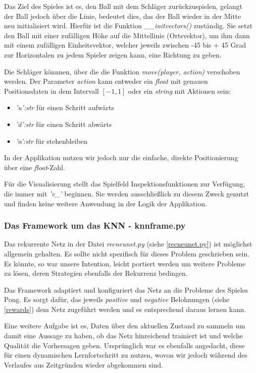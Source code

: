 \documentclass[12pt,twoside]{article}
\theoremstyle{plain}
\theoremstyle{definition}
\theoremstyle{remark}
\begin{document}
Das Ziel des Spieles ist es, den Ball mit dem Schläger zurückzuspielen, gelangt der Ball jedoch über die Linie, bedeutet dies, das der Ball wieder in der Mitte neu initialisiert wird. Hierfür ist die Funktion \textit{\_\_initvectors()} zuständig. Sie setzt den Ball mit einer zufälligen Höhe auf die Mittellinie (Ortsvektor), um ihm dann mit einem zufälligen Einheitsvektor, welcher jeweils zwischen -45 bis + 45 Grad zur Horizontalen zu jedem Spieler zeigen kann, eine Richtung zu geben.

Die Schläger könnnen, über die die Funktion \textit{move(player, action)} verschoben werden. Der Parameter \textit{action} kann entweder ein \textit{float} mit genauen Positionsdaten in dem Intervall
$ [-1 , 1] $ oder ein \textit{string} mit Aktionen sein:
\begin{itemize}
  \item \textit{'u':str} für einen Schritt aufwärts 
  \item \textit{'d':str} für einen Schritt abwärts 
  \item \textit{'n':str} für stehenbleiben
\end{itemize}
In der Applikation nutzen wir jedoch nur die einfache, direkte Positionierung über eine \textit{float}-Zahl.

Für die Visualisierung stellt das Spielfeld Inspektionsfunktionen zur Verfügung, die immer mit \textit{'v\_'} beginnen. Sie werden ausschließlich zu diesem Zweck genutzt und finden keine weitere Anwendung in der Logik der Applikation.

\subsubsection{Das Framework um das KNN - knnframe.py}
\label{knnframe.py}

Das rekurrente Netz in der Datei \textit{recneunet.py} (siehe \ref{recneunet.py}) ist möglichst allgemein gehalten. Es sollte nicht spezifisch für dieses Problem geschrieben sein. Es könnte, so war unsere Intention, leicht portiert werden um weitere Probleme zu lösen, deren Strategien ebenfalls der Rekurrenz bedingen.

Das Framework adaptiert und konfiguriert das Netz an die Probleme des Spieles Pong. Es sorgt dafür, das jeweils \textit{positive} und \textit{negative} Belohnungen (siehe \ref{rewards}) dem Netz zugeführt werden und es entsprechend daraus lernen kann.

Eine weitere Aufgabe ist es, Daten über den aktuellen Zustand zu sammeln um damit eine Aussage zu haben, ob das Netz hinreichend trainiert ist und welche Qualität die Vorhersagen geben. Ursprünglich war es ebenfalls angedacht, diese für einen dynamischen Lernfortschritt zu nutzen, wovon wir jedoch während des Verlaufes aus Zeitgründen wieder abgekommen sind. 
\end{document}
